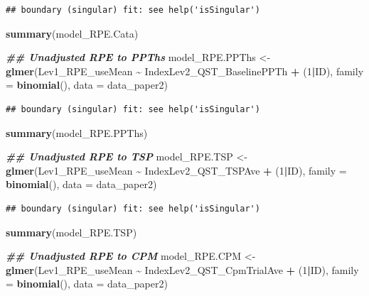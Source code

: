 \documentclass[
  12pt,
]{article}
\newenvironment{Shaded}{\begin{snugshade}}{\end{snugshade}}
\newcommand{\AttributeTok}[1]{\textcolor[rgb]{0.13,0.29,0.53}{#1}}
\newcommand{\DecValTok}[1]{\textcolor[rgb]{0.00,0.00,0.81}{#1}}
\newcommand{\DocumentationTok}[1]{\textcolor[rgb]{0.56,0.35,0.01}{\textbf{\textit{#1}}}}
\newcommand{\FunctionTok}[1]{\textcolor[rgb]{0.13,0.29,0.53}{\textbf{#1}}}
\newcommand{\NormalTok}[1]{#1}
\newcommand{\OtherTok}[1]{\textcolor[rgb]{0.56,0.35,0.01}{#1}}
\newcommand{\SpecialCharTok}[1]{\textcolor[rgb]{0.81,0.36,0.00}{\textbf{#1}}}
\begin{document}
\begin{verbatim}
## boundary (singular) fit: see help('isSingular')
\end{verbatim}

\begin{Shaded}
\begin{Highlighting}[]
\FunctionTok{summary}\NormalTok{(model\_RPE.Cata)}

\DocumentationTok{\#\# Unadjusted RPE to PPThs}
\NormalTok{model\_RPE.PPThs }\OtherTok{\textless{}{-}} \FunctionTok{glmer}\NormalTok{(Lev1\_RPE\_useMean }\SpecialCharTok{\textasciitilde{}}\NormalTok{ IndexLev2\_QST\_BaselinePPTh }\SpecialCharTok{+}\NormalTok{ (}\DecValTok{1}\SpecialCharTok{|}\NormalTok{ID), }\AttributeTok{family =} \FunctionTok{binomial}\NormalTok{(), }\AttributeTok{data =}\NormalTok{ data\_paper2)}
\end{Highlighting}
\end{Shaded}

\begin{verbatim}
## boundary (singular) fit: see help('isSingular')
\end{verbatim}

\begin{Shaded}
\begin{Highlighting}[]
\FunctionTok{summary}\NormalTok{(model\_RPE.PPThs)}

\DocumentationTok{\#\# Unadjusted RPE to TSP}
\NormalTok{model\_RPE.TSP }\OtherTok{\textless{}{-}} \FunctionTok{glmer}\NormalTok{(Lev1\_RPE\_useMean }\SpecialCharTok{\textasciitilde{}}\NormalTok{ IndexLev2\_QST\_TSPAve }\SpecialCharTok{+}\NormalTok{ (}\DecValTok{1}\SpecialCharTok{|}\NormalTok{ID), }\AttributeTok{family =} \FunctionTok{binomial}\NormalTok{(), }\AttributeTok{data =}\NormalTok{ data\_paper2)}
\end{Highlighting}
\end{Shaded}

\begin{verbatim}
## boundary (singular) fit: see help('isSingular')
\end{verbatim}

\begin{Shaded}
\begin{Highlighting}[]
\FunctionTok{summary}\NormalTok{(model\_RPE.TSP)}

\DocumentationTok{\#\# Unadjusted RPE to CPM}
\NormalTok{model\_RPE.CPM }\OtherTok{\textless{}{-}} \FunctionTok{glmer}\NormalTok{(Lev1\_RPE\_useMean }\SpecialCharTok{\textasciitilde{}}\NormalTok{ IndexLev2\_QST\_CpmTrialAve }\SpecialCharTok{+}\NormalTok{ (}\DecValTok{1}\SpecialCharTok{|}\NormalTok{ID), }\AttributeTok{family =} \FunctionTok{binomial}\NormalTok{(), }\AttributeTok{data =}\NormalTok{ data\_paper2)}
\end{Highlighting}
\end{Shaded}
\end{document}
